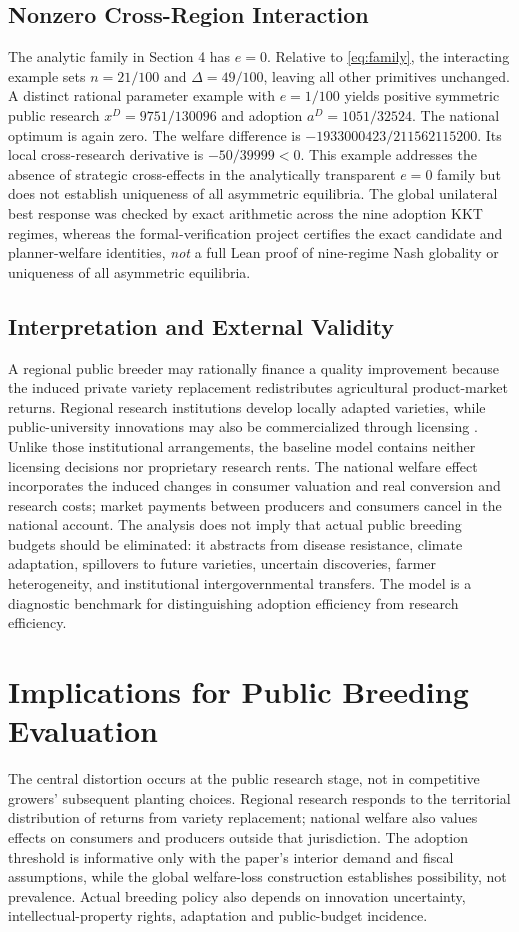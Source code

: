 \documentclass[USenglish]{article}
\begin{document}
\subsection{Nonzero Cross-Region Interaction}
The analytic family in Section 4 has $e=0$. Relative to \eqref{eq:family}, the interacting example sets $n=21/100$ and $\Delta=49/100$, leaving all other primitives unchanged. A distinct rational parameter example with $e=1/100$ yields positive symmetric public research $x^D=9751/130096$ and adoption $a^D=1051/32524$. The national optimum is again zero. The welfare difference is
$-1933000423/211562115200$. Its local cross-research derivative is $-50/39999<0$. This example addresses the absence of strategic cross-effects in the analytically transparent $e=0$ family but does not establish uniqueness of all asymmetric equilibria. The global unilateral best response was checked by exact arithmetic across the nine adoption KKT regimes, whereas the formal-verification project certifies the exact candidate and planner-welfare identities, \emph{not} a full Lean proof of nine-regime Nash globality or uniqueness of all asymmetric equilibria.

\subsection{Interpretation and External Validity}
A regional public breeder may rationally finance a quality improvement because the induced private variety replacement redistributes agricultural product-market returns. Regional research institutions develop locally adapted varieties, while public-university innovations may also be commercialized through licensing \citep{oecd2019japan,akhundjanov2020apple}. Unlike those institutional arrangements, the baseline model contains neither licensing decisions nor proprietary research rents. The national welfare effect incorporates the induced changes in consumer valuation and real conversion and research costs; market payments between producers and consumers cancel in the national account. The analysis does not imply that actual public breeding budgets should be eliminated: it abstracts from disease resistance, climate adaptation, spillovers to future varieties, uncertain discoveries, farmer heterogeneity, and institutional intergovernmental transfers. The model is a diagnostic benchmark for distinguishing adoption efficiency from research efficiency.

\section{Implications for Public Breeding Evaluation}
The central distortion occurs at the public research stage, not in competitive growers' subsequent planting choices. Regional research responds to the territorial distribution of returns from variety replacement; national welfare also values effects on consumers and producers outside that jurisdiction. The adoption threshold is informative only with the paper's interior demand and fiscal assumptions, while the global welfare-loss construction establishes possibility, not prevalence. Actual breeding policy also depends on innovation uncertainty, intellectual-property rights, adaptation and public-budget incidence.
\end{document}
